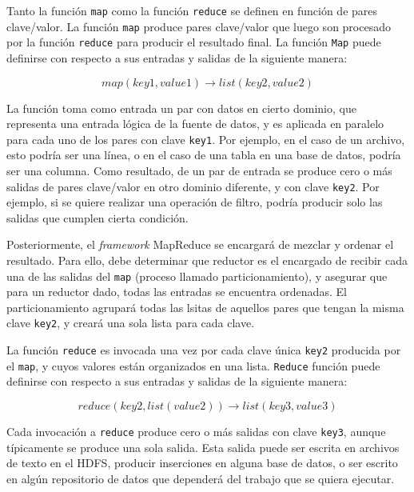\documentclass[conference]{IEEEtran}
\begin{document}
Tanto la función \texttt{map} como la función \texttt{reduce} se definen en función de pares clave/valor.
La función \texttt{map} produce pares clave/valor que luego son procesado por la función \texttt{reduce} para producir el resultado final.
La función \texttt{Map} puede definirse con respecto a sus entradas y salidas de la siguiente manera:

\begin{equation*}
map(key1, value1) \rightarrow list(key2, value2)
\end{equation*}


La función toma como entrada un par con datos en cierto dominio, que representa una entrada lógica de la fuente de datos, y es aplicada en paralelo para cada uno de los pares con clave \texttt{key1}.
Por ejemplo, en el caso de un archivo, esto podría ser una línea, o en el caso de una tabla en una base de datos, podría ser una columna. 
Como resultado, de un par de entrada se produce cero o más salidas de pares clave/valor en otro dominio diferente, y con clave \texttt{key2}.
Por ejemplo, si se quiere realizar una operación de filtro, podría producir solo las salidas que cumplen cierta condición.


Posteriormente, el \textit{framework} MapReduce se encargará de mezclar y ordenar el resultado.
Para ello, debe determinar que reductor es el encargado de recibir cada una de las salidas del \texttt{map} (proceso llamado particionamiento), y asegurar que para un reductor dado, todas las entradas se encuentra ordenadas.
El particionamiento agrupará todas las lsitas de aquellos pares que tengan la misma clave \texttt{key2}, y creará una sola lista para cada clave.


La función \texttt{reduce} es invocada una vez por cada clave única \texttt{key2} producida por el \texttt{map}, y cuyos valores están organizados en una lista.
\texttt{Reduce} función puede definirse con respecto a sus entradas y salidas de la siguiente manera:

\begin{equation*}
reduce(key2, list(value2)) \rightarrow list(key3, value3)
\end{equation*}

Cada invocación a \texttt{reduce} produce cero o más salidas con clave \texttt{key3}, aunque típicamente se produce una sola salida.
Esta salida puede ser escrita en archivos de texto en el HDFS, producir inserciones en alguna base de datos, o ser escrito en algún repositorio de datos que dependerá del trabajo que se quiera ejecutar.
\end{document}
